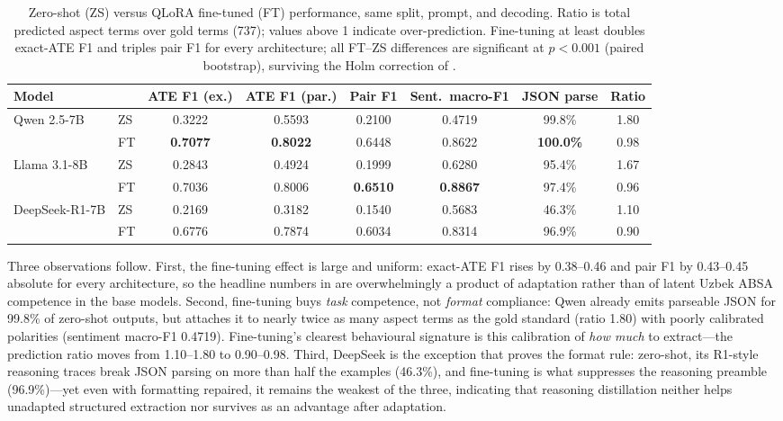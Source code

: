 \documentclass[bdcc,article,submit,moreauthors]{Definitions/mdpi}
\begin{document}
\begin{table}[!t]
\centering
\caption{Zero-shot (ZS) versus QLoRA fine-tuned (FT) performance, same split, prompt, and decoding. Ratio is total predicted aspect terms over gold terms (737); values above 1 indicate over-prediction. Fine-tuning at least doubles exact-ATE F1 and triples pair F1 for every architecture; all FT--ZS differences are significant at $p<0.001$ (paired bootstrap), surviving the Holm correction of .}
\label{tab:zeroshot}
\setlength{\tabcolsep}{3.4pt}
\small
\begin{tabular}{llcccccc}
\toprule
\textbf{Model} & & \textbf{ATE F1 (ex.)} & \textbf{ATE F1 (par.)} & \textbf{Pair F1} & \textbf{Sent.\ macro-F1} & \textbf{JSON parse} & \textbf{Ratio} \\
\midrule
\multirow{2}{*}{Qwen 2.5-7B}   & ZS & 0.3222 & 0.5593 & 0.2100 & 0.4719 & 99.8\% & 1.80 \\
                               & FT & \textbf{0.7077} & \textbf{0.8022} & 0.6448 & 0.8622 & \textbf{100.0\%} & 0.98 \\
\midrule
\multirow{2}{*}{Llama 3.1-8B}  & ZS & 0.2843 & 0.4924 & 0.1999 & 0.6280 & 95.4\% & 1.67 \\
                               & FT & 0.7036 & 0.8006 & \textbf{0.6510} & \textbf{0.8867} & 97.4\% & 0.96 \\
\midrule
\multirow{2}{*}{DeepSeek-R1-7B} & ZS & 0.2169 & 0.3182 & 0.1540 & 0.5683 & 46.3\% & 1.10 \\
                               & FT & 0.6776 & 0.7874 & 0.6034 & 0.8314 & 96.9\% & 0.90 \\
\bottomrule
\end{tabular}
\end{table}

Three observations follow. First, the fine-tuning effect is large and uniform: exact-ATE F1 rises by 0.38--0.46 and pair F1 by 0.43--0.45 absolute for every architecture, so the headline numbers in  are overwhelmingly a product of adaptation rather than of latent Uzbek ABSA competence in the base models. Second, fine-tuning buys \emph{task} competence, not \emph{format} compliance: Qwen already emits parseable JSON for 99.8\% of zero-shot outputs, but attaches it to nearly twice as many aspect terms as the gold standard (ratio 1.80) with poorly calibrated polarities (sentiment macro-F1 0.4719). Fine-tuning's clearest behavioural signature is this calibration of \emph{how much} to extract---the prediction ratio moves from 1.10--1.80 to 0.90--0.98. Third, DeepSeek is the exception that proves the format rule: zero-shot, its R1-style reasoning traces break JSON parsing on more than half the examples (46.3\%), and fine-tuning is what suppresses the reasoning preamble (96.9\%)---yet even with formatting repaired, it remains the weakest of the three, indicating that reasoning distillation neither helps unadapted structured extraction nor survives as an advantage after adaptation.
\end{document}
